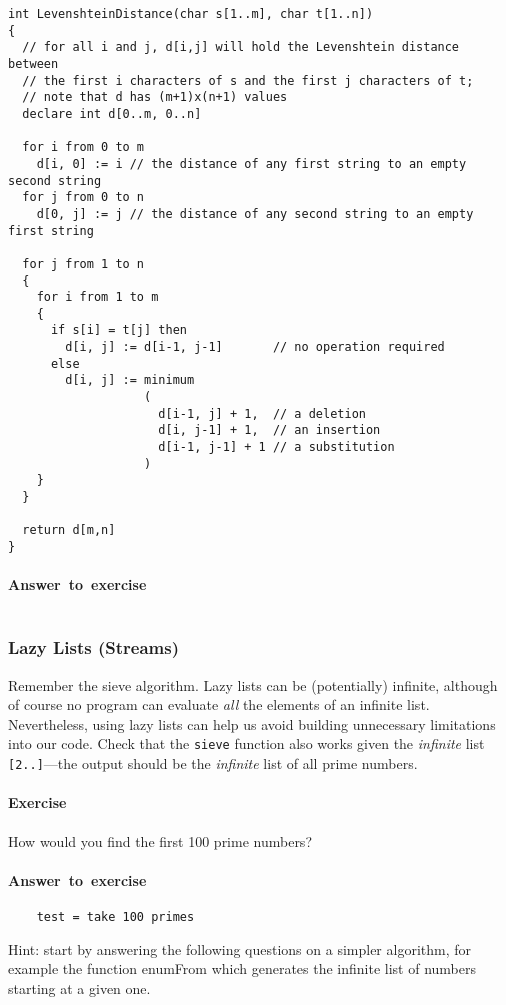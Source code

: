 \documentclass{article}
\newcommand{\percents}[1]{\protect \marginpar[l]{\bf [#1]}}
\newcounter{question}
\newcommand{\question}[1]{
  \addtocounter{question}{1}
  \paragraph{Exercise~\arabic{question}  \percents{#1}}
 }
\newenvironment{ex}[1]{\question{#1}}{\vspace{1em}}
\newenvironment{ans}{\begin{oframed}\paragraph{Answer~to~exercise~\arabic{question}}}{\end{oframed}}
\newcommand{\correctedLastYear}[1]{}
\begin{document}
\begin{verbatim}
int LevenshteinDistance(char s[1..m], char t[1..n])
{
  // for all i and j, d[i,j] will hold the Levenshtein distance between
  // the first i characters of s and the first j characters of t;
  // note that d has (m+1)x(n+1) values
  declare int d[0..m, 0..n]

  for i from 0 to m
    d[i, 0] := i // the distance of any first string to an empty second string
  for j from 0 to n
    d[0, j] := j // the distance of any second string to an empty first string

  for j from 1 to n
  {
    for i from 1 to m
    {
      if s[i] = t[j] then
        d[i, j] := d[i-1, j-1]       // no operation required
      else
        d[i, j] := minimum
                   (
                     d[i-1, j] + 1,  // a deletion
                     d[i, j-1] + 1,  // an insertion
                     d[i-1, j-1] + 1 // a substitution
                   )
    }
  }

  return d[m,n]
}
\end{verbatim}

\begin{ans}
\inputminted{haskell}{Diff.hs}
\end{ans}

\subsubsection{Lazy Lists (Streams)}

Remember the sieve algorithm. Lazy lists can be (potentially)
infinite, although of course no program can evaluate {\em all} the
elements of an infinite list. Nevertheless, using lazy lists can help
us avoid building unnecessary limitations into our code.  Check that
the \verb!sieve! function also works given the {\em infinite} list
\verb![2..]!---the output should be the {\em infinite} list of all
prime numbers.

\begin{ex}{*\correctedLastYear5,@5}
How would you find the first 100 prime numbers?
\begin{ans}
  \begin{verbatim}
    test = take 100 primes
  \end{verbatim}
\end{ans}
\end{ex}

Hint: start by answering the following questions on a simpler
algorithm, for example the function \textsf{enumFrom} which generates
the infinite list of numbers starting at a given one.
\end{document}
